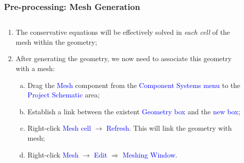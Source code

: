 \documentclass[10pt,compress]{beamer}
\newcommand{\blue}{\textcolor{blue}}
\begin{document}
 
\begin{frame}
 \frametitle{Pre-processing: Mesh Generation} 
    \begin{columns}
       \begin{column}[l]{0.5\linewidth}
          \begin{enumerate}\scriptsize
             \item<1-> The conservative equations will be effectively solved in {\it each cell} of the mesh within the geometry;
             \item<1-> After generating the geometry, we now need to associate this geometry with a mesh:
                \begin{enumerate}[a)]\scriptsize
                   \item<2-> Drag the \blue{Mesh} component from the \blue{Component Systems menu} to the \blue{Project Schematic} area;
                   \item<2-> Establish a link between the existent \blue{Geometry box} and the \blue{new box}; 
                   \item<2-> Right-click \blue{Mesh cell} $\rightarrow$ \blue{Refresh}. This will link the geometry with mesh; 
                   \item<2-> Right-click \blue{Mesh} $\rightarrow$ \blue{Edit} $\Longrightarrow$ \blue{Meshing Window}.
                \end{enumerate}
          \end{enumerate}
       \end{column}
       \begin{column}[l]{0.5\linewidth}
       \end{column}
    \end{columns}
\end{frame} 
\end{document}
